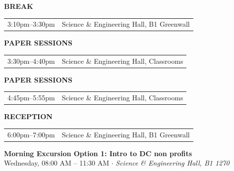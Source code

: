 \documentclass[
  10pt,
  letterpaper,
  DIV=11,
  numbers=noendperiod]{scrartcl}
\begin{document}
{\vspace{0.25em}

\noindent\textcolor{event}{\textbf{BREAK}}

\begin{tabular}{@{}p{3.2cm}p{\dimexpr\linewidth-3.5cm}@{}}
  3:10pm--3:30pm & Science \& Engineering Hall, B1 Greenwall \\
\end{tabular}

\vspace{0.25em}

\noindent\textcolor{event}{\textbf{PAPER SESSIONS}}

\begin{tabular}{@{}p{3.2cm}p{\dimexpr\linewidth-3.5cm}@{}}
  3:30pm--4:40pm & Science \& Engineering Hall, Classrooms \\
\end{tabular}

\vspace{0.25em}

\noindent\textcolor{event}{\textbf{PAPER SESSIONS}}

\begin{tabular}{@{}p{3.2cm}p{\dimexpr\linewidth-3.5cm}@{}}
  4:45pm--5:55pm & Science \& Engineering Hall, Classrooms \\
\end{tabular}

\vspace{0.25em}

\noindent\textcolor{event}{\textbf{RECEPTION}}

\begin{tabular}{@{}p{3.2cm}p{\dimexpr\linewidth-3.5cm}@{}}
  6:00pm--7:00pm & Science \& Engineering Hall, B1 Greenwall \\
\end{tabular}

\vspace{0.25em}

}
\newpage


\begin{center}
\colorbox{event!15}{\parbox{0.9\linewidth}{\centering
  \textcolor{event}{\large\textbf{Morning Excursion Option 1: Intro to DC non profits}}\\[2pt]
  {\small Wednesday, 08:00 AM – 11:30 AM $\cdot$ \textit{Science \& Engineering Hall, B1 1270}}
}}
\end{center}
\end{document}

